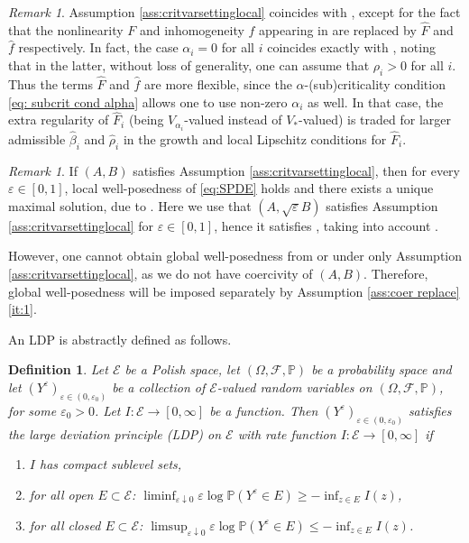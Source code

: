 \documentclass{amsart}
\newcommand{\<}{\langle}
\newcommand{\?}{\rangle}
\theoremstyle{plain}
\theoremstyle{remark}
\newtheorem{remark}[theorem]{Remark}
\theoremstyle{plain}
\newtheorem{definition}[theorem]{Definition}
\numberwithin{equation}{section}
\newcommand{\F}{\mathcal{F}}
\renewcommand{\P}{\mathbb{P}}
\newcommand{\Om}{\Omega}
\newcommand{\eps}{\varepsilon}
\begin{document}
\begin{remark}\label{rem:difference AB}
Assumption \ref{ass:critvarsettinglocal} coincides with \cite[Asm.\ 2.2]{TV24}, except for the fact that the nonlinearity $F$ and inhomogeneity $f$ appearing in \cite[Asm.\ 2.2]{TV24} are replaced by $\hat{F}$ and  $\hat{f}$ respectively. 
In fact, the case $\alpha_i=0$ for all $i$ coincides exactly with \cite[Asm.\ 2.2]{TV24}, noting that in the latter, without loss of generality, one can assume that $\rho_i>0$ for all $i$.  
Thus the terms $\hat{F}$ and $\hat{f}$ are more flexible, since the $\alpha$-(sub)criticality condition \eqref{eq: subcrit cond alpha} allows one to use non-zero $\alpha_i$ as well. In that case, the extra regularity of $\hat{F}_i$ (being $V_{\alpha_i}$-valued instead of $V_*$-valued) is traded for larger admissible $\hat{\beta}_i$ and $\hat{\rho}_i$ in the growth and local Lipschitz conditions for $\hat{F}_i$. 
\end{remark}


\begin{remark}\label{rem: SPDE loc well-posed}
If $(A,B)$  satisfies Assumption \ref{ass:critvarsettinglocal}, then for every $\eps\in[0,1]$, local well-posedness of  \eqref{eq:SPDE} holds  and there exists a unique maximal solution, due to \cite[Th.\ 5.5]{BGV}. Here we use that $(A,\sqrt{\eps}B)$ satisfies Assumption  \ref{ass:critvarsettinglocal} for  $\eps\in[0,1]$, hence it satisfies  \cite[Asm.\ 5.1]{BGV}, taking into account \cite[Rem.\ 5.2(3)]{BGV}.   

However, one cannot obtain global well-posedness from \cite[Th.\ 3.4, Th.\ 3.5]{AV22variational} or \cite[\S7]{BGV} under only Assumption \ref{ass:critvarsettinglocal}, as we do not have coercivity of $(A,B)$. Therefore, global well-posedness will be imposed separately by Assumption \ref{ass:coer replace}\ref{it:1}. 
\end{remark} 


An LDP is abstractly defined as follows.

\begin{definition}\label{def: LDP}
Let $\mathcal{E}$ be a Polish space, let $(\Om,\F,\P)$ be a probability space and let $(Y^\eps)_{\eps\in(0,\eps_0)}$ be a collection of $\mathcal{E}$-valued random variables on $(\Om,\F,\P)$, for some $\eps_0>0$. Let $I\colon \mathcal{E}\to[0,\infty]$ be a function. Then $(Y^{\eps})_{\eps\in(0,\eps_0)}$  \emph{satisfies the large deviation principle (LDP) on $\mathcal{E}$} with rate function $I\colon \mathcal{E}\to[0,\infty]$ if
\begin{enumerate}[label=\emph{(\roman*)},ref=\textup{(\roman*)}]
    \item $I$ has compact sublevel sets,
    \item for all open $E\subset \mathcal{E}$: $\liminf_{\eps\downarrow0}\eps\log \P(Y^{\eps}\in E)\geq -\inf_{z\in E}I(z)$,
    \item for all closed $E\subset \mathcal{E}$: $\limsup_{\eps\downarrow0}\eps\log \P(Y^{\eps}\in E)\leq -\inf_{z\in E}I(z)$.
\end{enumerate} 
\end{definition} 
\end{document}
